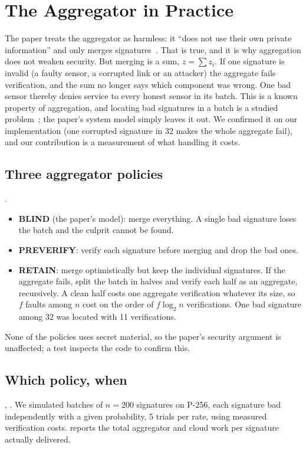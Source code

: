 \section{The Aggregator in Practice}\label{sec:agg}

The paper treats the aggregator as harmless: it ``does not use their own private information'' and only
merges signatures~\cite{qiao2023}. That is true, and it is why aggregation does not weaken security. But
merging is a sum, $z=\sum z_i$. If one signature is invalid (a faulty sensor, a corrupted link or an
attacker) the aggregate fails verification, and the sum no longer says which component was wrong. One
bad sensor thereby denies service to every honest sensor in its batch. This is a known property of
aggregation, and locating bad signatures in a batch is a studied problem~\cite{pastuszak2000}; the
paper's system model simply leaves it out. We confirmed it on our implementation (one corrupted signature
in 32 makes the whole aggregate fail), and our contribution is a measurement of what handling it costs.

\subsection{Three aggregator policies}
.
\begin{itemize}
\item \textbf{BLIND} (the paper's model): merge everything. A single bad signature loses the batch and the
      culprit cannot be found.
\item \textbf{PREVERIFY}: verify each signature before merging and drop the bad ones.
\item \textbf{RETAIN}: merge optimistically but keep the individual signatures. If the aggregate fails,
      split the batch in halves and verify each half as an aggregate, recursively. A clean half costs one
      aggregate verification whatever its size, so $f$ faults among $n$ cost on the order of $f\log_2 n$
      verifications. One bad signature among 32 was located with 11 verifications.
\end{itemize}
None of the policies uses secret material, so the paper's security argument is unaffected; a test
inspects the code to confirm this.

\subsection{Which policy, when}
, . We simulated batches of $n=200$ signatures on P-256, each signature bad
independently with a given probability, 5 trials per rate, using measured verification costs.
 reports the total aggregator and cloud work per signature actually delivered.


